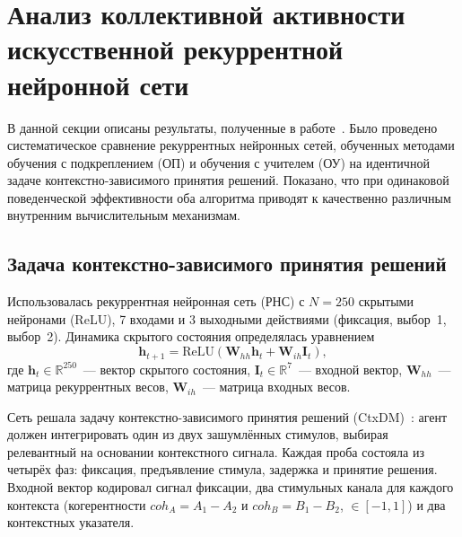 
\section{Анализ коллективной активности искусственной рекуррентной нейронной сети}\label{sec:rnn}


В данной секции описаны результаты, полученные в работе~\cite{Kononov2025}. Было проведено систематическое сравнение рекуррентных нейронных сетей, обученных методами обучения с подкреплением (ОП) и обучения с учителем (ОУ) на идентичной задаче контекстно-зависимого принятия решений. Показано, что при одинаковой поведенческой эффективности оба алгоритма приводят к качественно различным внутренним вычислительным механизмам.


\subsection{Задача контекстно-зависимого принятия решений}

Использовалась рекуррентная нейронная сеть (РНС) с $N = 250$ скрытыми нейронами (ReLU), 7 входами и 3 выходными действиями (фиксация, выбор~1, выбор~2). Динамика скрытого состояния определялась уравнением
\begin{equation}
\mathbf{h}_{t+1} = \text{ReLU}(\mathbf{W}_{hh} \mathbf{h}_t + \mathbf{W}_{ih} \mathbf{I}_t),
\label{eq:rnn_update}
\end{equation}
где $\mathbf{h}_t \in \mathbb{R}^{250}$~--- вектор скрытого состояния, $\mathbf{I}_t \in \mathbb{R}^{7}$~--- входной вектор, $\mathbf{W}_{hh}$~--- матрица рекуррентных весов, $\mathbf{W}_{ih}$~--- матрица входных весов.

Сеть решала задачу контекстно-зависимого принятия решений (CtxDM)~\cite{Mante2013}: агент должен интегрировать один из двух зашумлённых стимулов, выбирая релевантный на основании контекстного сигнала. Каждая проба состояла из четырёх фаз: фиксация, предъявление стимула, задержка и принятие решения. Входной вектор кодировал сигнал фиксации, два стимульных канала для каждого контекста (когерентности $coh_A = A_1 - A_2$ и $coh_B = B_1 - B_2$, $\in [-1, 1]$) и два контекстных указателя.

